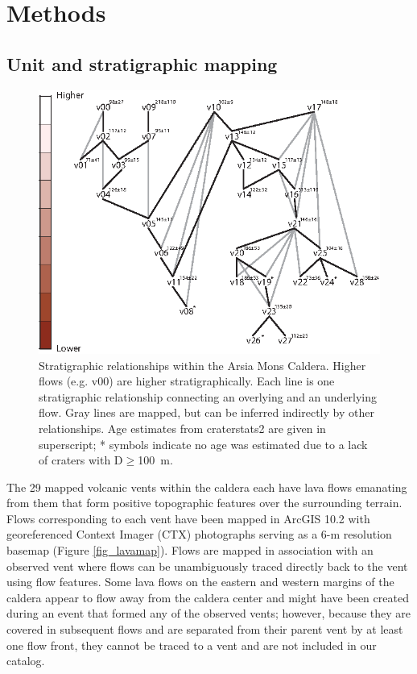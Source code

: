 \documentclass[12pt,letter]{article}
\begin{document}
\section{Methods}

\subsection{Unit and stratigraphic mapping}

\begin{figure}
\centering
\includegraphics[width=0.6\linewidth]{figures/stratigraphy_web.png}
\caption{Stratigraphic relationships within the Arsia Mons Caldera. Higher flows (e.g. v00) are higher stratigraphically. Each line is one stratigraphic relationship connecting an overlying and an underlying flow. Gray lines are mapped, but can be inferred indirectly by other relationships. Age estimates from craterstats2 are given in superscript; * symbols indicate no age was estimated due to a lack of craters with D$\ge$100~m.}
\label{fig_stratweb}
\end{figure}

The 29 mapped volcanic vents within the caldera each have lava flows emanating from them that form positive topographic features over the surrounding terrain. Flows corresponding to each vent have been mapped in ArcGIS 10.2 with georeferenced Context Imager (CTX) photographs \citep{malin2007context} serving as a 6-m resolution basemap (Figure \ref{fig_lavamap}). Flows are mapped in association with an observed vent where flows can be unambiguously traced directly back to the vent using flow features. Some lava flows on the eastern and western margins of the caldera appear to flow away from the caldera center and might have been created during an event that formed any of the observed vents; however, because they are covered in subsequent flows and are separated from their parent vent by at least one flow front, they cannot be traced to a vent and are not included in our catalog.
\end{document}
